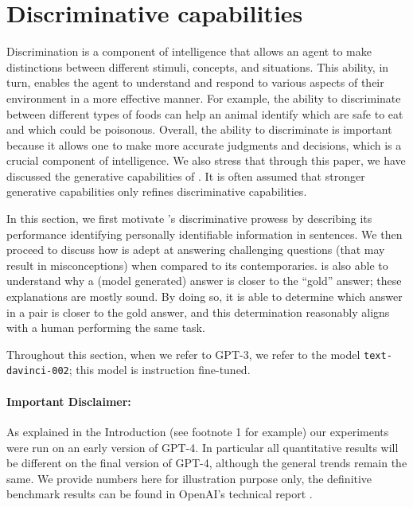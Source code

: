 \section{Discriminative capabilities}
\label{sec:discriminative}


Discrimination is a component of intelligence that allows an agent to make distinctions between different stimuli, concepts, and situations. This ability, in turn, enables the agent to understand and respond to various aspects of their environment in a more effective manner. For example, the ability to discriminate between different types of foods can help an animal identify which are safe to eat and which could be poisonous. Overall, the ability to discriminate is important because it allows one to make more accurate judgments and decisions, which is a crucial component of intelligence. We also stress that through this paper, we have discussed the generative capabilities of \DV. It is often assumed that stronger generative capabilities only refines discriminative capabilities.

In this section, we first motivate \DV's discriminative prowess by describing its performance identifying personally identifiable information in sentences. We then proceed to discuss how {\DV} is adept at answering challenging questions (that may result in misconceptions) when compared to its contemporaries. {\DV} is also able to understand why a (model generated) answer is closer to the ``gold'' answer; these explanations are mostly sound. By doing so, it is able to determine which answer in a pair is closer to the gold answer, and this determination reasonably aligns with a human performing the same task. 

Throughout this section, when we refer to GPT-3, we refer to the model \texttt{text-davinci-002}; this model is instruction fine-tuned.


\paragraph{Important Disclaimer:} As explained in the Introduction (see footnote 1 for example) our experiments were run on an early version of GPT-4. In particular all quantitative results will be different on the final version of GPT-4, although the general trends remain the same. We provide numbers here for illustration purpose only, the definitive benchmark results can be found in OpenAI's technical report \cite{gpt4}.


